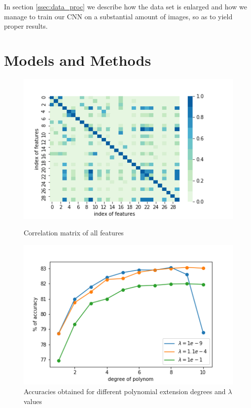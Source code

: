 \documentclass[10pt,conference,compsocconf]{IEEEtran}
\begin{document}
In section \ref{ssec:data_proc} we describe how the data set is enlarged and how we manage to train our CNN on a substantial amount of images, so as to yield proper results.


\section{Models and Methods}
\label{sec:methods}


\begin{figure}[h]
	\centering
	\begin{minipage}[b]{0.48\linewidth}
		\includegraphics[width=\textwidth]{correlation.png}
		\captionsetup{aboveskip=0.4cm,justification=centering, margin=0.1cm, labelfont=footnotesize, textfont=footnotesize}
		\caption{Correlation matrix of all features}
		\label{fig:correlation}
	\end{minipage}
	\hspace{0.05cm}
	\begin{minipage}[b]{0.48\linewidth}
		\includegraphics[width=\textwidth]{grid_search.png}
		\captionsetup{aboveskip=0.1cm,justification=centering, margin=0.1cm, labelfont=footnotesize, textfont=footnotesize}
		\caption{Accuracies obtained for different polynomial extension degrees and $\lambda$ values}
		\label{fig:grid_search}
	\end{minipage}
\end{figure}
\end{document}
